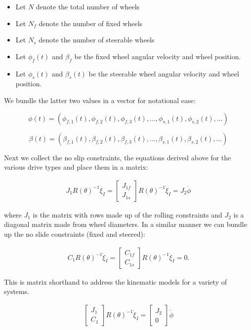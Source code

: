 \begin{itemize}
\tightlist
\item
  Let \(N\) denote the total number of wheels
\item
  Let \(N_f\) denote the number of fixed wheels
\item
  Let \(N_s\) denote the number of steerable wheels
\item
  Let \(\phi_f(t)\) and \(\beta_f\) be the fixed wheel angular velocity
  and wheel position.
\item
  Let \(\phi_s(t)\) and \(\beta_s(t)\) be the steerable wheel angular
  velocity and wheel position.
\end{itemize}

We bundle the latter two values in a vector for notational ease:

\[\phi (t) = ( \phi_{f,1}(t),
\phi_{f,2}(t), \phi_{f,3}(t), ..., \phi_{s,1}(t), \phi_{s,2}(t), ...)\]

\[\beta (t) = ( \beta_{f,1}(t),
\beta_{f,2}(t), \beta_{f,3}(t), ..., \beta_{s,1}(t), \beta_{s,2}(t), ...)\]

Next we collect the no slip constraints, the equations derived above for
the various drive types and place them in a matrix:

\[\begin{aligned}
J_1 R(\theta)^{-1}\dot{\xi}_I = \begin{bmatrix} J_{1f} \\ J_{1s}\end{bmatrix} R(\theta)^{-1} \dot{\xi}_I= J_2 \dot{\phi}
\end{aligned}\]

where \(J_1\) is the matrix with rows made up of the rolling constraints
and \(J_2\) is a diagonal matrix made from wheel diameters. In a similar
manner we can bundle up the no slide constraints (fixed and steered):

\[\begin{aligned}
C_1 R(\theta)^{-1}\dot{\xi}_I = \begin{bmatrix} C_{1f} \\ C_{1s}\end{bmatrix} R(\theta)^{-1} \dot{\xi}_I = 0.
\end{aligned}\]

This is matrix shorthand to address the kinematic models for a variety
of systems.

\[\begin{aligned}
\begin{bmatrix} J_1 \\ C_1 \end{bmatrix} R(\theta)^{-1} \dot{\xi}_I = \begin{bmatrix} J_2 \\ 0\end{bmatrix} \dot{\phi}
\end{aligned}\]
